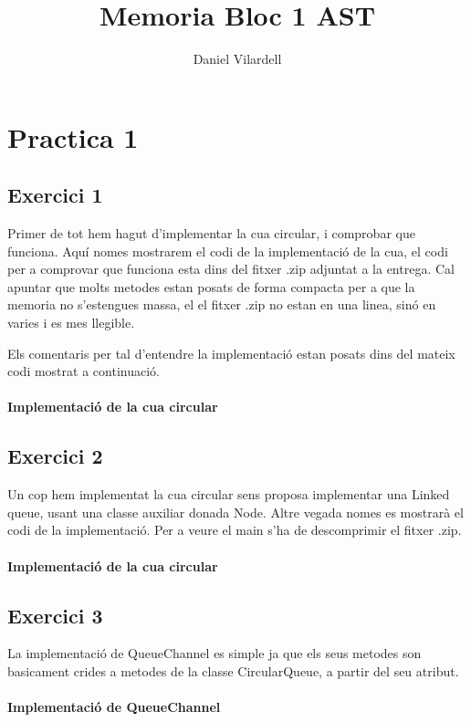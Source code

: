 \documentclass[12pt, a4papre]{article}
\author{Daniel Vilardell}
\title{Memoria Bloc 1 AST}
\date{}
\begin{document}
	\maketitle
	\tableofcontents
	\newpage
	\section{Practica 1}
	\subsection{Exercici 1} 
	
	Primer de tot hem hagut d'implementar la cua circular, i comprobar que funciona. Aquí nomes mostrarem el codi de la implementació de la cua, el codi per a comprovar que funciona esta dins del fitxer .zip adjuntat a la entrega. Cal apuntar que molts metodes estan posats de forma compacta per a que la memoria no s'estengues massa, el el fitxer .zip no estan en una linea, sinó en varies i es mes llegible.
	
	Els comentaris per tal d'entendre la implementació estan posats dins del mateix codi mostrat a continuació.
	\\\\
	\textbf{Implementació de la cua circular}
	
	
	\subsection{Exercici 2} 
	
	Un cop hem implementat la cua circular sens proposa implementar una Linked queue, usant una classe auxiliar donada Node. Altre vegada nomes es mostrarà el codi de la implementació. Per a veure el main s'ha de descomprimir el fitxer .zip.
	\\\\
	\textbf{Implementació de la cua circular}
	
	
	\subsection{Exercici 3} 
	
	La implementació de QueueChannel es simple ja que els seus metodes son basicament crides a metodes de la classe CircularQueue, a partir del seu atribut.
	\\\\
	\textbf{Implementació de QueueChannel}
	
	
\end{document}
